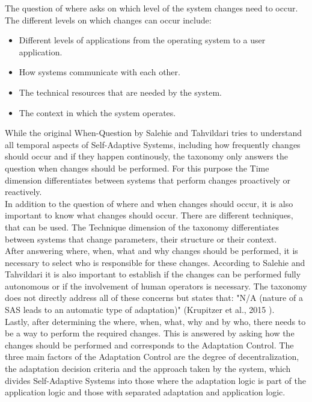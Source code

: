 The question of where asks on which level of the system changes need to occur.
The different levels on which changes can occur include:
\begin{itemize}
    \item Different levels of applications from the operating system to a user application.
    \item How systems communicate with each other.
    \item The technical resources that are needed by the system.
    \item The context in which the system operates.
\end{itemize}

While the original When-Question by Salehie and Tahvildari tries to understand all temporal aspects of Self-Adaptive Systems,
including how frequently changes should occur and if they happen continously,
the taxonomy only answers the question when changes should be performed.
For this purpose the Time dimension differentiates between systems that perform changes proactively or reactively. \\

In addition to the question of where and when changes should occur, it is also important to know
what changes should occur. There are different techniques, that can be used.
The Technique dimension of the taxonomy differentiates between systems that change parameters, their structure or their context. \\

After answering where, when, what and why changes should be performed, 
it is necessary to select who is responsible for these changes.
According to Salehie and Tahvildari it is also important to establish if the changes can be performed fully autonomous
or if the involvement of human operators is necessary.
The taxonomy does not directly address all of these concerns but states that:
"N/A (nature of a SAS leads to an automatic type of adaptation)" (Krupitzer et al., 2015 \cite{SurveyOnEngineeringApproaches}). \\

Lastly, after determining the where, when, what, why and by who, there needs to be a way
to perform the required changes. This is answered by asking how the changes should be performed
and corresponds to the Adaptation Control.
The three main factors of the Adaptation Control are the degree of decentralization, the adaptation decision criteria
and the approach taken by the system, which divides Self-Adaptive Systems into those where the adaptation logic is part of the application logic
and those with separated adaptation and application logic.



